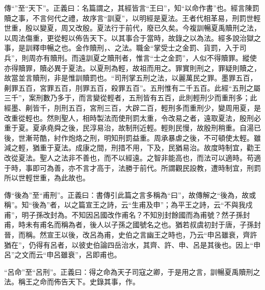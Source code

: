 {\noindent\zhuan{}\fzbyks 傳“”至“天下”。正義曰：名篇謂之，其經皆言“王曰”，知“以命作書”也。經言陳罰贖之事，不言何代之禮，故序言“訓夏”，以明經是夏法。王者代相革易，刑罰世輕世重，殷以變夏，周又改殷。夏法行于前代，廢已久矣。今複訓暢夏禹贖刑之法，以周法傷重，更從輕以佈告天下。以其事合于當時，故錄之以為法。經多說治獄之事，是訓釋申暢之也。金作贖刑，、之法。職金“掌受士之金罰、貨罰，入于司兵”，則周亦有贖刑。而遠訓夏之贖刑者，惟言“士之金罰”，人似不得贖罪。縱使亦得贖罪，贖必異于夏法。以夏刑為輕，故祖而用之。罪實則刑之，罪疑則贖之，故當並言贖刑，非是惟訓贖罰也。“司刑掌五刑之法，以麗萬民之罪。墨罪五百，劓罪五百，宮罪五百，刖罪五百，殺罪五百”。五刑惟有二千五百。此經“五刑之屬三千”，案刑數乃多于，而言變從輕者，五刑皆有五百，此則輕刑少而重刑多；此經墨、劓皆千，刖刑五百，宮刑三百，大辟二百，輕刑多而重刑少，變周用夏，是改重從輕也。然則聖人，相時製法而使刑罰太重，令改易之者，遠取夏法，殷刑必重于夏。夏承堯舜之後，民淳易治，故制刑近輕。輕則民慢，故殷刑稍重。自湯已後，世漸苛酷，紂作炮烙之刑，明知刑罰益重。周承暴虐之後，不可頓使太輕。雖減之輕，猶重于夏法。成康之間，刑措不用，下及，民猶易治。故度時制宜，勸王改從夏法。聖人之法非不善也，而不以經遠。之智非能高也，而法可以適時。苟適于時，事即可為善，亦不言才高于，法勝于前代。所謂觀民設教，遭時制宜，刑罰所以世輕世重，為此故也。 \par}

{\noindent\zhuan{}\fzbyks 傳“後為”至“甫刑”。正義曰：書傳引此篇之言多稱為“曰”，故傳解之“後為，故或稱”。知“後為”者，以之篇宣王之詩，云“生甫及申”；為平王之詩，云“不與我戍甫”，明子孫改封為。不知因呂國改作甫名？不知別封餘國而為甫號？然子孫封甫，時未有甫名而稱為者，後人以子孫之國號名之也。猶若叔虞初封于唐，子孫封晉，而稱。然宣王以後，改呂為甫，史伯之言幽王之時也，乃云“申呂雖衰，齊許猶在”，仍得有呂者，以彼史伯論四岳治水，其齊、許、申、呂是其後也。因上“申呂”之文而云“申呂雖衰”，呂即甫也。 \par}

{\noindent\shu{}\fzkt “呂命”至“呂刑”。正義曰：得之命為天子司寇之卿，于是用之言，訓暢夏禹贖刑之法。稱王之命而佈告天下。史錄其事，作。 \par}


